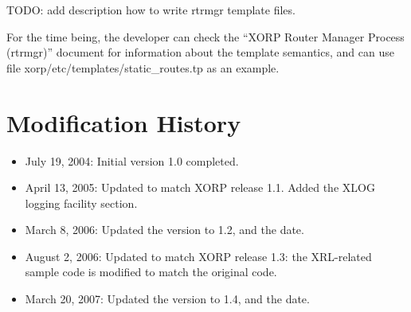 \documentclass[11pt]{article}
\begin{document}
TODO: add description how to write rtrmgr template files.

For the time being, the developer can check the ``XORP Router Manager Process
(rtrmgr)'' document for information about the template semantics, and can use
file {\stt xorp/etc/templates/static\_routes.tp} as an example.

\newpage

\appendix
\section{Modification History}

\begin{itemize}

  \item July 19, 2004: Initial version 1.0 completed.

  \item April 13, 2005: Updated to match XORP release 1.1.
   Added the XLOG logging facility section.

  \item March 8, 2006: Updated the version to 1.2, and the date.

  \item August 2, 2006: Updated to match XORP release 1.3: the XRL-related
  sample code is modified to match the original code.

  \item March 20, 2007: Updated the version to 1.4, and the date.

\end{itemize}




\end{document}

